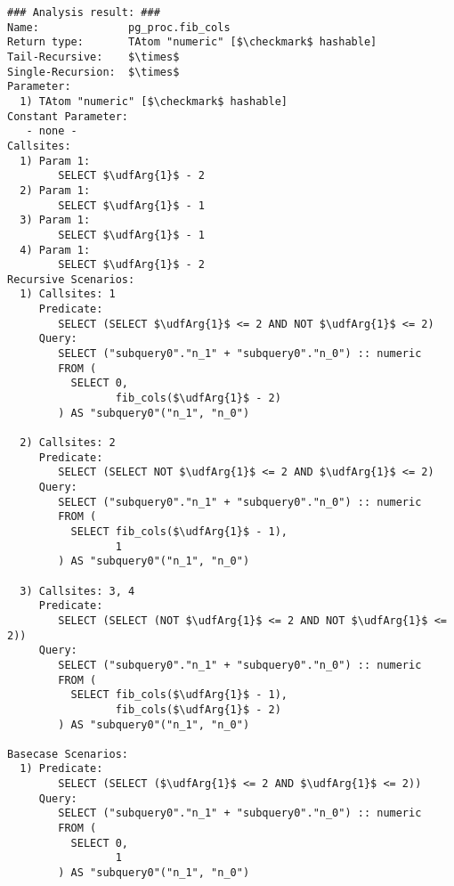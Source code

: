 \begin{lstlisting}[basicstyle=\ttfamily\scriptsize]
### Analysis result: ###
Name:              pg_proc.fib_cols
Return type:       TAtom "numeric" [$\checkmark$ hashable]
Tail-Recursive:    $\times$
Single-Recursion:  $\times$
Parameter:
  1) TAtom "numeric" [$\checkmark$ hashable]
Constant Parameter:
   - none -
Callsites:
  1) Param 1:
        SELECT $\udfArg{1}$ - 2 
  2) Param 1:
        SELECT $\udfArg{1}$ - 1 
  3) Param 1:
        SELECT $\udfArg{1}$ - 1 
  4) Param 1:
        SELECT $\udfArg{1}$ - 2 
Recursive Scenarios:
  1) Callsites: 1
     Predicate:
        SELECT (SELECT $\udfArg{1}$ <= 2 AND NOT $\udfArg{1}$ <= 2) 
     Query:
        SELECT ("subquery0"."n_1" + "subquery0"."n_0") :: numeric
        FROM (
          SELECT 0,
                 fib_cols($\udfArg{1}$ - 2)
        ) AS "subquery0"("n_1", "n_0")

  2) Callsites: 2
     Predicate:
        SELECT (SELECT NOT $\udfArg{1}$ <= 2 AND $\udfArg{1}$ <= 2) 
     Query:
        SELECT ("subquery0"."n_1" + "subquery0"."n_0") :: numeric
        FROM (
          SELECT fib_cols($\udfArg{1}$ - 1), 
                 1
        ) AS "subquery0"("n_1", "n_0")

  3) Callsites: 3, 4
     Predicate:
        SELECT (SELECT (NOT $\udfArg{1}$ <= 2 AND NOT $\udfArg{1}$ <= 2)) 
     Query:
        SELECT ("subquery0"."n_1" + "subquery0"."n_0") :: numeric
        FROM (
          SELECT fib_cols($\udfArg{1}$ - 1), 
                 fib_cols($\udfArg{1}$ - 2)
        ) AS "subquery0"("n_1", "n_0")

Basecase Scenarios:
  1) Predicate:
        SELECT (SELECT ($\udfArg{1}$ <= 2 AND $\udfArg{1}$ <= 2)) 
     Query:
        SELECT ("subquery0"."n_1" + "subquery0"."n_0") :: numeric
        FROM (
          SELECT 0,
                 1
        ) AS "subquery0"("n_1", "n_0")

\end{lstlisting}